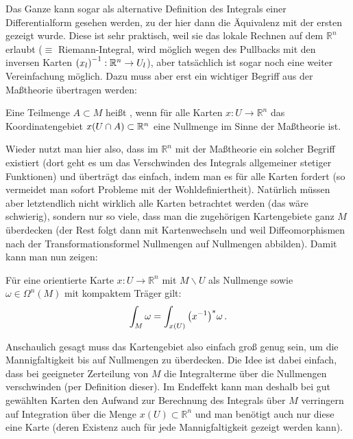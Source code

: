 \documentclass[../H_Analysis_main.tex]{subfiles}
\begin{document}
Das Ganze kann sogar als alternative Definition des Integrals einer Differentialform gesehen werden, zu der hier dann die Äquivalenz mit der ersten gezeigt wurde. Diese ist sehr praktisch, weil sie das lokale Rechnen auf dem $\mathbb{R}^n$ erlaubt ($\equiv$ Riemann-Integral, wird möglich wegen des Pullbacks mit den inversen Karten $\qty(x_l)^{-1}: \mathbb{R}^n \rightarrow U_l$), aber tatsächlich ist sogar noch eine weiter Vereinfachung möglich. Dazu muss aber erst ein wichtiger Begriff aus der Maßtheorie übertragen werden:
\begin{defi}[Nullmenge]
Eine Teilmenge $A \subset M$ heißt , wenn für alle Karten $x: U \rightarrow \mathbb{R}^n$ das Koordinatengebiet $x\qty(U \cap A) \subset \mathbb{R}^n$ eine Nullmenge im Sinne der Maßtheorie ist.
\end{defi}

Wieder nutzt man hier also, dass im $\mathbb{R}^n$ mit der Maßtheorie ein solcher Begriff existiert (dort geht es um das Verschwinden des Integrals allgemeiner stetiger Funktionen) und überträgt das einfach, indem man es für alle Karten fordert (so vermeidet man sofort Probleme mit der Wohldefiniertheit). Natürlich müssen aber letztendlich nicht wirklich alle Karten betrachtet werden (das wäre schwierig), sondern nur so viele, dass man die zugehörigen Kartengebiete ganz $M$ überdecken (der Rest folgt dann mit Kartenwechseln und weil Diffeomorphismen nach der Transformationsformel Nullmengen auf Nullmengen abbilden). Damit kann man nun zeigen:
\begin{cor}
Für eine orientierte Karte $x: U \rightarrow \mathbb{R}^n$ mit $M \backslash U$ als Nullmenge sowie $\omega \in \Omega^n(M)$ mit kompaktem Träger gilt:
\begin{equation}\label{eq:intvereinf}
\int_M \omega = \int_{x(U)} \qty(x^{-1})^* \omega \, .
\end{equation}
\end{cor}
Anschaulich gesagt muss das Kartengebiet also einfach groß genug sein, um die Mannigfaltigkeit bis auf Nullmengen zu überdecken. Die Idee ist dabei einfach, dass bei geeigneter Zerteilung von $M$ die Integralterme über die Nullmengen verschwinden (per Definition dieser). Im Endeffekt kann man deshalb bei gut gewählten Karten den Aufwand zur Berechnung des Integrals über $M$ verringern auf Integration über die Menge $x(U) \subset \mathbb{R}^n$ und man benötigt auch nur diese eine Karte (deren Existenz auch für jede Mannigfaltigkeit gezeigt werden kann).
\end{document}
